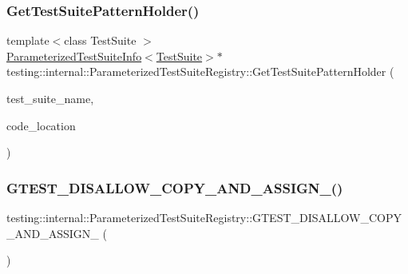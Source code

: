 \subsubsection{\texorpdfstring{Get\+Test\+Suite\+Pattern\+Holder()}{GetTestSuitePatternHolder()}}
{\footnotesize\ttfamily template$<$class Test\+Suite $>$ \\
\hyperlink{classtesting_1_1internal_1_1ParameterizedTestSuiteInfo}{Parameterized\+Test\+Suite\+Info}$<$\hyperlink{classtesting_1_1TestSuite}{Test\+Suite}$>$$\ast$ testing\+::internal\+::\+Parameterized\+Test\+Suite\+Registry\+::\+Get\+Test\+Suite\+Pattern\+Holder (\begin{DoxyParamCaption}\item[{const char $\ast$}]{test\+\_\+suite\+\_\+name,  }\item[{\hyperlink{structtesting_1_1internal_1_1CodeLocation}{Code\+Location}}]{code\+\_\+location }\end{DoxyParamCaption})\hspace{0.3cm}{\ttfamily [inline]}}

\mbox{\label{classtesting_1_1internal_1_1ParameterizedTestSuiteRegistry_ac1454da4ff60ddeda6b4e60f1b6ce606}} 
\subsubsection{\texorpdfstring{G\+T\+E\+S\+T\+\_\+\+D\+I\+S\+A\+L\+L\+O\+W\+\_\+\+C\+O\+P\+Y\+\_\+\+A\+N\+D\+\_\+\+A\+S\+S\+I\+G\+N\+\_\+()}{GTEST\_DISALLOW\_COPY\_AND\_ASSIGN\_()}}
{\footnotesize\ttfamily testing\+::internal\+::\+Parameterized\+Test\+Suite\+Registry\+::\+G\+T\+E\+S\+T\+\_\+\+D\+I\+S\+A\+L\+L\+O\+W\+\_\+\+C\+O\+P\+Y\+\_\+\+A\+N\+D\+\_\+\+A\+S\+S\+I\+G\+N\+\_\+ (\begin{DoxyParamCaption}\item[{\hyperlink{classtesting_1_1internal_1_1ParameterizedTestSuiteRegistry}{Parameterized\+Test\+Suite\+Registry}}]{ }\end{DoxyParamCaption})\hspace{0.3cm}{\ttfamily [private]}}

